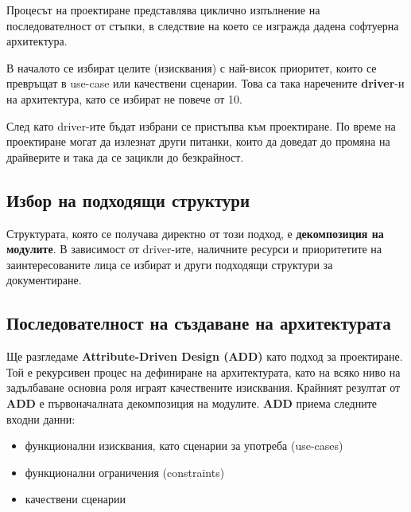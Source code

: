 \documentclass[fleqn,12pt]{article}
\begin{document}
Процесът на проектиране представлява циклично изпълнение на последователност от стъпки, в следствие на което се изгражда дадена софтуерна архитектура.
\bigbreak

В началото се избират целите (изисквания) с най-висок приоритет, които се превръщат в use-case или качествени сценарии.
Това са така наречените \textbf{driver}-и на архитектура, като се избират не повече от 10.
\bigbreak

След като driver-ите бъдат избрани се пристъпва към проектиране.
По време на проектиране могат да излезнат други питанки, които да доведат до промяна на драйверите и така да се зацикли до безкрайност.

\subsection{Избор на подходящи структури}

Структурата, която се получава директно от този подход, е \textbf{декомпозиция на модулите}.
В зависимост от driver-ите, наличните ресурси и приоритетите на заинтересованите лица се избират и други подходящи структури за документиране.

\subsection{Последователност на създаване на архитектурата}

Ще разгледаме \textbf{Attribute-Driven Design (ADD)} като подход за проектиране.
Той е рекурсивен процес на дефиниране на архитектурата, като на всяко ниво на задълбаване основна роля играят качествените изисквания.
Крайният резултат от \textbf{ADD} е първоначалната декомпозиция на модулите.
\bigbreak
\textbf{ADD} приема следните входни данни:
\begin{itemize}
    \item функционални изисквания, като сценарии за употреба (use-cases)
    \item функционални ограничения (constraints)
    \item качествени сценарии
\end{itemize}
\end{document}
